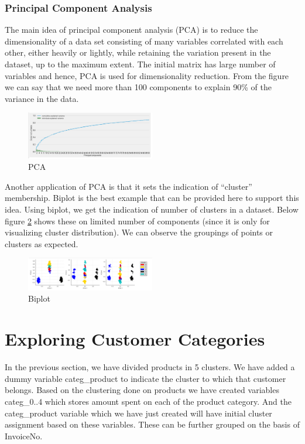 \subsubsection{\textbf{Principal Component Analysis}}

The main idea of principal component analysis (PCA) is to reduce the dimensionality of a data set consisting of many variables correlated with each other, either heavily or lightly, while retaining the variation present in the dataset, up to the maximum extent. The initial matrix has large number of variables and hence, PCA is used for dimensionality reduction. From the figure we can say that we need more than 100 components to explain 90\% of the variance in the data.\\

\begin{figure}[H]
\caption{PCA}
\label{3.5}
\centering
\includegraphics[width=0.5\textwidth]{images/3_5.PNG}
\end{figure}

Another application of PCA is that it sets the indication of “cluster” membership. Biplot is the best example that can be provided here to support this idea. Using biplot, we get the indication of number of clusters in a dataset. Below figure \ref{3.6} shows these on limited number of components (since it is only for visualizing cluster distribution). We can observe the groupings of points or clusters as expected.\\

\begin{figure}[H]
\caption{Biplot}
\label{3.6}
\centering
\includegraphics[width=0.5\textwidth]{images/3_6.PNG}
\end{figure}

\section{Exploring Customer Categories}


In the previous section, we have divided products in 5 clusters. We have added a dummy variable categ\_product to indicate the cluster to which that customer belongs. Based on the clustering done on products we have created variables categ\_0..4 which stores amount spent on each of the product category. And the categ\_product variable which we have just created will have initial cluster assignment based on these variables. These can be further grouped on the basis of InvoiceNo.\\

